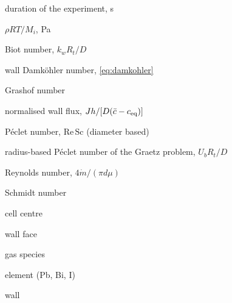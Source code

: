{\begin{longnomenclature}
\item[$\tau_{\rm exp}$] duration of the experiment, s
\item[$\chi_i$] $\rho RT/M_i$, Pa
\item[Bi] Biot number, $k_wR_t/D$
\item[$\mathrm{Da}_i$] wall Damk\"ohler number, \cref{eq:damkohler}
\item[Gr] Grashof number
\item[$\hat J$] normalised wall flux, $Jh/[D(\bar c-c_{\rm eq})]$
\item[Pe] P\'eclet number, $\mathrm{Re\,Sc}$ (diameter based)
\item[$\mathrm{Pe}_R$] radius-based P\'eclet number of the Graetz problem,
  $U_bR_t/D$
\item[Re] Reynolds number, $4\dot m/(\pi d\mu)$
\item[Sc] Schmidt number
\item[$c$] cell centre
\item[$f$] wall face
\item[$i$] gas species
\item[$k$] element (Pb, Bi, I)
\item[$w$] wall
\end{longnomenclature}
}
